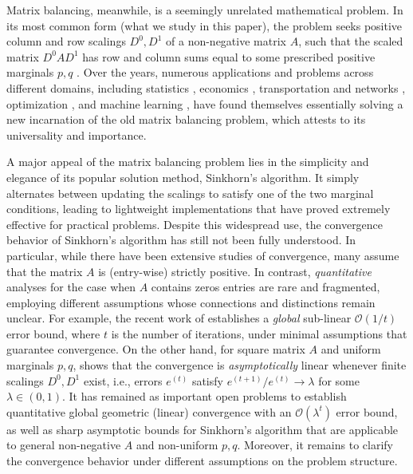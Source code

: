 Matrix balancing, meanwhile, is a seemingly unrelated mathematical problem. In its most common form (what we study in this paper), the problem seeks positive column and row scalings $D^0,D^1$ of a non-negative matrix $A$, such that the scaled matrix $D^0AD^1$ has row and column sums equal to some prescribed positive marginals $p,q$ \citep{sinkhorn1967diagonal}. Over the years, numerous applications and problems across different domains, including statistics \citep{yule1912methods,deming1940least}, 
economics \citep{stone1962multiple,galichon2021unreasonable}, transportation and networks \citep{kruithof1937telefoonverkeersrekening,lamond1981bregman,chang2021mobility}, optimization \citep{ruiz2001scaling}, and machine learning \citep{cuturi2013sinkhorn,peyre2019computational}, have found themselves essentially solving a new incarnation of the old matrix balancing problem, which attests to its universality and importance. 

A major appeal of the matrix balancing problem lies in the simplicity and elegance of its popular solution method, Sinkhorn's algorithm. It simply alternates between updating the scalings to satisfy one of the two marginal conditions, leading to lightweight implementations that have proved extremely effective for practical problems. Despite this widespread use, the convergence behavior of Sinkhorn's algorithm has still not been fully understood. In particular, while there have been extensive studies of convergence, many assume that the matrix $A$ is (entry-wise) strictly positive. In contrast, \emph{quantitative} analyses for the case when $A$ contains zeros entries are rare and fragmented, employing different assumptions whose connections and distinctions remain unclear. For example, the recent work of \citet{leger2021gradient} establishes a \emph{global} sub-linear $\mathcal{O}(1/t)$ error bound, where $t$ is the number of iterations, under minimal assumptions that guarantee convergence. On the other hand, for square matrix $A$ and uniform marginals $p,q$, \citet{knight2008sinkhorn}
shows that the convergence is \emph{asymptotically} linear whenever finite scalings $D^0,D^1$ exist, i.e., errors $e^{(t)}$ satisfy $e^{(t+1)}/e^{(t)}\rightarrow \lambda$ for some $\lambda \in (0,1)$. It has remained as important open problems to establish quantitative global geometric (linear) convergence with an $\mathcal{O}(\lambda^t)$ error bound, as well as sharp asymptotic bounds for Sinkhorn's algorithm that are applicable to general non-negative $A$ and non-uniform $p,q$. Moreover, it remains to clarify the convergence behavior under different assumptions on the problem structure.

